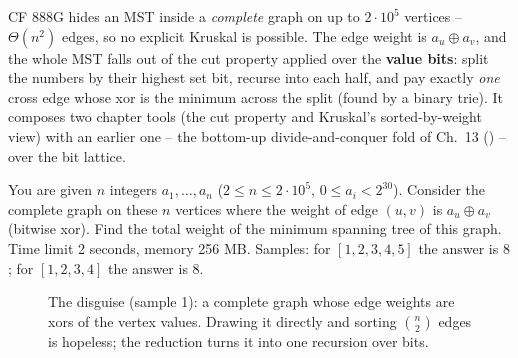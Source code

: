 
\begin{notebox}
CF 888G hides an MST inside a \emph{complete} graph on up to \(2\cdot10^5\)
vertices -- \(\Theta(n^2)\) edges, so no explicit Kruskal is possible.  The edge
weight is \(a_u \oplus a_v\), and the whole MST falls out of the cut property
applied over the \textbf{value bits}: split the numbers by their highest set bit,
recurse into each half, and pay exactly \emph{one} cross edge whose xor is the
minimum across the split (found by a binary trie).  It composes two chapter tools
(the cut property and Kruskal's sorted-by-weight view) with an earlier one -- the
bottom-up divide-and-conquer fold of Ch.~13 () -- over the bit lattice.
\end{notebox}


\begin{problemstatement}
You are given \(n\) integers \(a_1,\dots,a_n\) (\(2\le n\le 2\cdot 10^5\),
\(0\le a_i < 2^{30}\)).  Consider the complete graph on these \(n\) vertices where
the weight of edge \((u,v)\) is \(a_u \oplus a_v\) (bitwise xor).  Find the total
weight of the minimum spanning tree of this graph.  Time limit 2 seconds, memory
256 MB.  Samples: for \([1,2,3,4,5]\) the answer is \(8\); for \([1,2,3,4]\) the
answer is \(8\).
\end{problemstatement}

\begin{figure}[H]
\centering
{}
\caption{The disguise (sample 1): a complete graph whose edge weights are xors of
the vertex values.  Drawing it directly and sorting \(\binom n2\) edges is
hopeless; the reduction turns it into one recursion over bits.}
\label{fig:c17-summit-disguise}
\end{figure}

